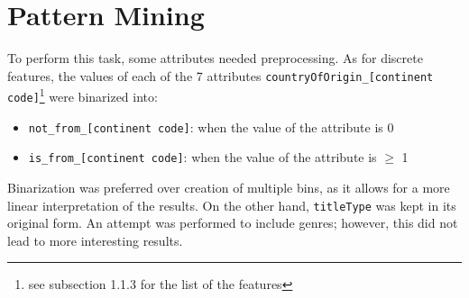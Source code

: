 \chapter{Pattern Mining}
\label{ch:capitolo2}

To perform this task, some attributes needed preprocessing. As for discrete features, the values of each of the 7 attributes \texttt{countryOfOrigin\_[continent code]}\footnote{see subsection 1.1.3 for the list of the features} were binarized into:
\begin{itemize}
    \item \texttt{not\_from\_[continent code]}: when the value of the attribute is 0
    \item \texttt{is\_from\_[continent code]}: when the value of the attribute is $\geq$ 1
\end{itemize}
Binarization was preferred over creation of multiple bins, as it allows for a more linear interpretation of the results. 
On the other hand, \texttt{titleType} was kept in its original form.  An attempt was performed to include genres; however, this did not lead to more interesting results.
\\


